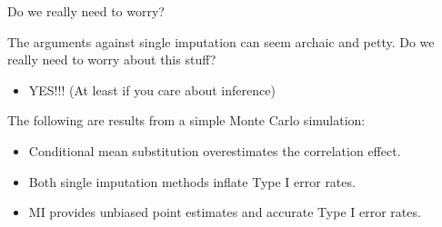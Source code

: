 \documentclass{beamer}\usepackage[]{graphicx}\usepackage[]{color}
\begin{document}
\begin{frame}[shrink = 5]{Do we really need to worry?}

  The arguments against single imputation can seem archaic and petty. Do we 
  really need to worry about this stuff?\\  
  \pause
  \vc
  \begin{itemize}
  \item YES!!! (At least if you care about inference)\\
  \end{itemize}
  \vb
  The following are results from a simple Monte Carlo simulation:
  
\begin{table}[ht]
\centering
{}
\caption{Mean Correlation Coefficients and Type I Error Rates} 
\end{table}


\pause
{}
\begin{itemize}
\item Conditional mean substitution overestimates the correlation effect.
  \vc
\item Both single imputation methods inflate Type I error rates.
  \vc
\item MI provides unbiased point estimates and accurate Type I error rates.
\end{itemize}

\end{frame}

\watermarkoff %
\end{document}
